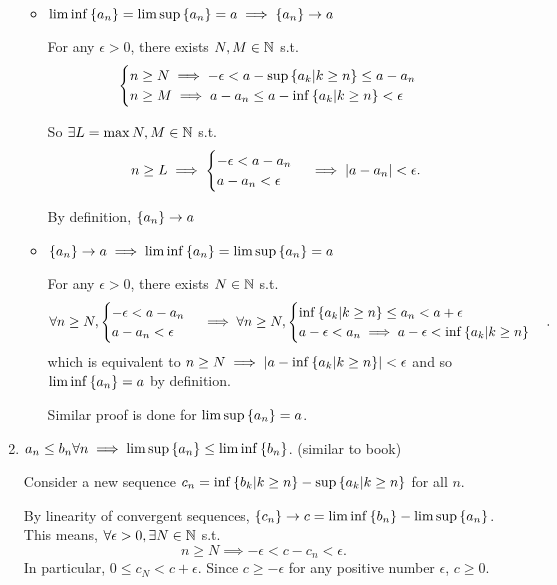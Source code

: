 \begin{enumerate}[label=(\roman*)]
    \begin{itemize}
        \item $\liminf\left\{a_n\right\} = \limsup\left\{a_n\right\} = a \implies \left\{a_n\right\}\to a$
        
        For any $\epsilon > 0$, there exists $N, M\in\mathbb{N}$ s.t.
        \[\begin{cases}
            n\geq N \implies -\epsilon < a - \sup\left\{a_k | k \geq n\right\} \leq a - a_n \\
            n\geq M \implies a - a_n \leq a - \inf\left\{a_k | k \geq n\right\} < \epsilon
        \end{cases} \]

        So $\exists L = \max{N, M} \in \mathbb{N}$ s.t.
        \[ n \geq L \implies \begin{cases}
            -\epsilon < a - a_n \\ a - a_n < \epsilon
        \end{cases} \implies \left|a - a_n\right| < \epsilon. \] 

        By definition, $\left\{a_n\right\}\to a$

        \item $\left\{a_n\right\}\to a \implies \liminf\left\{a_n\right\} = \limsup\left\{a_n\right\} = a$
        
        For any $\epsilon > 0$, there exists $N \in\mathbb{N}$ s.t.
        \[\forall n \geq N, \begin{cases}
            -\epsilon < a - a_n \\
            a - a_n < \epsilon
        \end{cases}\implies \forall n \geq N,\begin{cases}
            \inf\left\{a_k | k \geq n\right\} \leq a_n < a + \epsilon \\
            a - \epsilon < a_n \implies a - \epsilon < \inf\left\{a_k | k \geq n\right\} 
        \end{cases}. \]
        which is equivalent to $n\geq N \implies \left|a - \inf\left\{a_k | k \geq n\right\}\right| < \epsilon$ and so $\liminf\left\{a_n\right\} = a$ by definition.

        Similar proof is done for $\limsup\left\{a_n\right\} = a$.
    \end{itemize}
     

    \item $a_n \leq b_n \forall n \implies \limsup\left\{a_n\right\} \leq \liminf\left\{b_n\right\}$. (similar to book)
    
    Consider a new sequence $c_n = \inf\left\{b_k | k \geq n\right\} - \sup\left\{a_k | k \geq n\right\}$ for all $n$. 
    
    By linearity of convergent sequences, $\left\{c_n\right\}\to c = \liminf\left\{b_n\right\} - \limsup\left\{a_n\right\}$.
    This means, $\forall \epsilon > 0, \exists N\in\mathbb{N}$ s.t.
    \[ n\geq N \implies -\epsilon < c - c_n < \epsilon. \]
    In particular, $0\leq c_N < c + \epsilon$. Since $c \geq -\epsilon$ for any positive number $\epsilon$, $c \geq 0$.
\end{enumerate}

